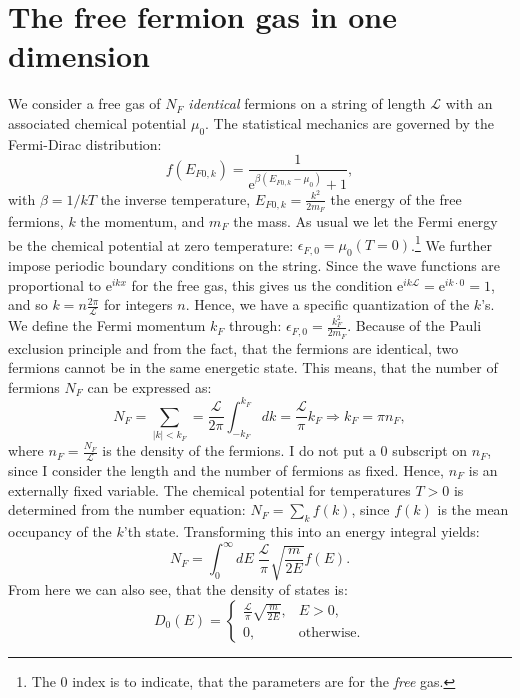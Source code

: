 \section{The free fermion gas in one dimension} \label{sec.chemicalpotential.freegas}
We consider a free gas of $N_F$ \textit{identical} fermions on a string of length $\mathcal{L}$ with an associated chemical potential $\mu_0$. The statistical mechanics are governed by the Fermi-Dirac distribution:
\begin{equation}
f(E_{F0,k}) = \frac{1}{\text{e}^{\beta(E_{F0,k}-\mu_0)} + 1},
\end{equation}
with $\beta = 1/kT$ the inverse temperature, $E_{F0,k} = \frac{k^2}{2m_F}$ the energy of the free fermions, $k$ the momentum, and $m_F$ the mass. As usual we let the Fermi energy be the chemical potential at zero temperature: $\epsilon_{F,0} = \mu_0(T=0)$.\footnote{The 0 index is to indicate, that the parameters are for the \textit{free} gas.} We further impose periodic boundary conditions on the string. Since the wave functions are proportional to $\text{e}^{ikx}$ for the free gas, this gives us the condition $\text{e}^{ik\mathcal{L}} = \text{e}^{ik\cdot 0} = 1$, and so $k = n\frac{2\pi}{\mathcal{L}}$ for integers $n$. Hence, we have a specific quantization of the $k$'s. We define the Fermi momentum $k_F$ through: $\epsilon_{F,0} = \frac{k_F^2}{2m_F}$. Because of the Pauli exclusion principle and from the fact, that the fermions are identical, two fermions cannot be in the same energetic state. This means, that the number of fermions $N_F$ can be expressed as:
\begin{equation}
N_F = \sum_{|k|< k_F} = \frac{\mathcal{L}}{2\pi} \int_{-k_F}^{k_F} dk = \frac{\mathcal{L}}{\pi} k_F \Rightarrow k_F = \pi n_F, 
\label{eq.relationkfnf}
\end{equation}
where $n_F = \frac{N_F}{\mathcal{L}}$ is the density of the fermions. I do not put a 0 subscript on $n_F$, since I consider the length and the number of fermions as fixed. Hence, $n_F$ is an externally fixed variable. The chemical potential for temperatures $T>0$ is determined from the number equation: $N_F = \sum_k f(k)$, since $f(k)$ is the mean occupancy of the $k$'th state. Transforming this into an energy integral yields:
\begin{equation}
N_F = \int_0^\infty dE \; \frac{\mathcal{L}}{\pi}\sqrt{\frac{m}{2E}} f(E). 
\label{eq.numberequationfreegas}
\end{equation}
From here we can also see, that the density of states is:
\begin{equation}
D_0(E) = \left\{\begin{matrix}
 \frac{\mathcal{L}}{\pi}\sqrt{\frac{m}{2E}}, & E > 0,  \\ 
 0, & \text{otherwise}. 
\end{matrix}\right. 
\label{eq.densityofstatesfreegas}
\end{equation}
